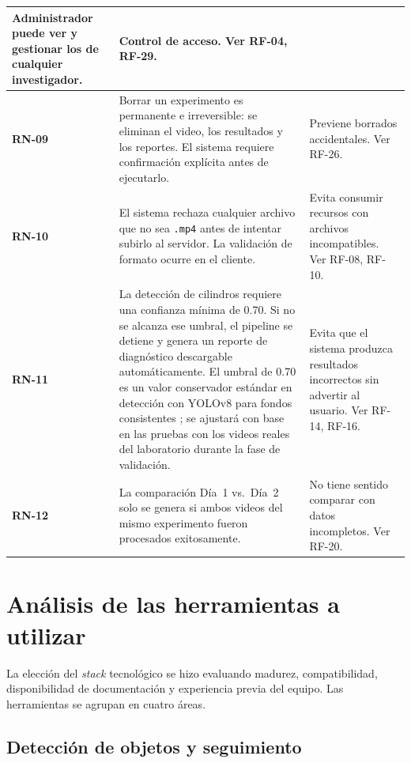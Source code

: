 \begin{longtable}{|>{\bfseries}p{1.1cm}|p{8.1cm}|p{3.9cm}|}
        Administrador puede ver y gestionar los de cualquier investigador.
      & Control de acceso. Ver RF-04, RF-29. \\
\hline
RN-09 & Borrar un experimento es permanente e irreversible: se eliminan el video,
        los resultados y los reportes. El sistema requiere confirmación explícita
        antes de ejecutarlo.
      & Previene borrados accidentales. Ver RF-26. \\
\hline
RN-10 & El sistema rechaza cualquier archivo que no sea \texttt{.mp4} antes de
        intentar subirlo al servidor. La validación de formato ocurre en el cliente.
      & Evita consumir recursos con archivos incompatibles. Ver RF-08, RF-10. \\
\hline
RN-11 & La detección de cilindros requiere una confianza mínima de 0.70. Si no se
        alcanza ese umbral, el pipeline se detiene y genera un reporte de
        diagnóstico descargable automáticamente. El umbral de 0.70 es un valor
        conservador estándar en detección con YOLOv8 para fondos consistentes
        \cite{stadler2024_yolov8}; se ajustará con base en las pruebas con los
        videos reales del laboratorio durante la fase de validación.
      & Evita que el sistema produzca resultados incorrectos sin advertir al
        usuario. Ver RF-14, RF-16. \\
\hline
RN-12 & La comparación Día~1 vs.\ Día~2 solo se genera si ambos videos del mismo
        experimento fueron procesados exitosamente.
      & No tiene sentido comparar con datos incompletos. Ver RF-20. \\
\hline

\end{longtable}

\section{Análisis de las herramientas a utilizar}

La elección del \textit{stack} tecnológico se hizo evaluando madurez, compatibilidad,
disponibilidad de documentación y experiencia previa del equipo. Las herramientas se
agrupan en cuatro áreas.

\subsection{Detección de objetos y seguimiento}

